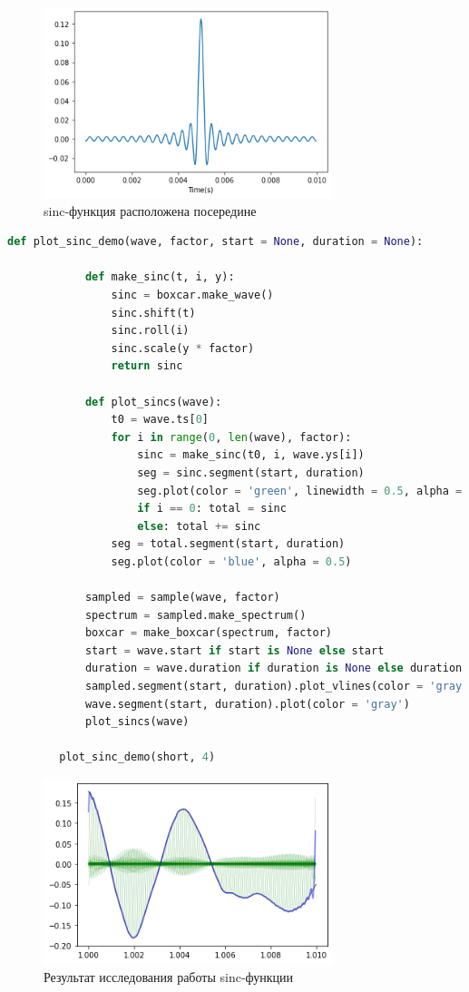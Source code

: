 \documentclass[a4paper, 12pt]{report}
\begin{document}
	\begin{figure}[H]
		\centering
		\includegraphics[width=0.75\textwidth]{sinc3.png}
		\caption{sinc-функция расположена посередине}
		\label{fig:sinc3}
	\end{figure}
	\begin{lstlisting}[language=Python,caption=Исследование sinc-функции]
		def plot_sinc_demo(wave, factor, start = None, duration = None):

			def make_sinc(t, i, y):
				sinc = boxcar.make_wave()
				sinc.shift(t)
				sinc.roll(i)
				sinc.scale(y * factor)
				return sinc
 
			def plot_sincs(wave):
				t0 = wave.ts[0]
				for i in range(0, len(wave), factor):
					sinc = make_sinc(t0, i, wave.ys[i])
					seg = sinc.segment(start, duration)
					seg.plot(color = 'green', linewidth = 0.5, alpha = 0.3)
					if i == 0: total = sinc
					else: total += sinc     
				seg = total.segment(start, duration)        
				seg.plot(color = 'blue', alpha = 0.5)

			sampled = sample(wave, factor)
			spectrum = sampled.make_spectrum()
			boxcar = make_boxcar(spectrum, factor)
			start = wave.start if start is None else start
			duration = wave.duration if duration is None else duration   
			sampled.segment(start, duration).plot_vlines(color = 'gray')
			wave.segment(start, duration).plot(color = 'gray')
			plot_sincs(wave)

		plot_sinc_demo(short, 4)
	\end{lstlisting}
	\begin{figure}[H]
		\centering
		\includegraphics[width=0.75\textwidth]{sinc4.png}
		\caption{Результат исследования работы sinc-функции}
		\label{fig:sinc4}
	\end{figure}
\end{document}
